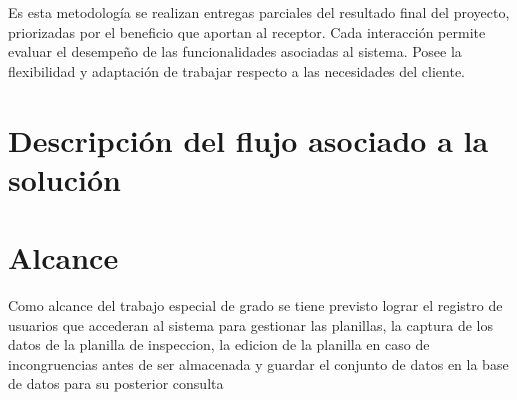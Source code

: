 Es esta metodología se realizan entregas parciales del resultado final del proyecto, priorizadas por el beneficio que aportan al receptor. Cada interacción permite evaluar el desempeño de las funcionalidades asociadas al sistema. Posee la flexibilidad y adaptación de trabajar respecto a las necesidades del cliente. 

\setlength{\parskip}{0mm}


\section{Descripción del flujo asociado a la solución}



\section{Alcance}

Como alcance del trabajo especial de grado se tiene previsto lograr el registro de usuarios que accederan al sistema para gestionar las planillas, la captura de los datos de la planilla de inspeccion, la edicion de la planilla en caso de incongruencias antes de ser almacenada y guardar el conjunto de datos en la base de datos para su posterior consulta





